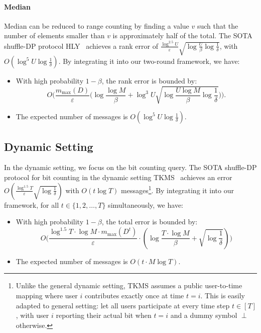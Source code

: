 \paragraph{Median}

Median can be reduced to range counting by finding a value $v$ such that the number of elements smaller than $v$ is approximately half of the total. The SOTA shuffle-DP protocol HLY~\cite{huang2021instance} achieves a rank error of $\frac{\log^{2.5} U}{\varepsilon} \sqrt{\log \frac{U}{\beta}\log \frac{1}{\delta}}$, with $O(\log ^5 U \log \frac{1}{\delta})$.
By integrating it into our two-round framework, we have:
\begin{itemize}
\item With high probability $1-\beta$, the rank error is bounded by: $$O\Big(\frac{m_{\max}(D)}{\varepsilon}\big( \log \frac{\log M}{\beta}+\log^3 U \sqrt{\log \frac{U\log M}{\beta}\log \frac{1}{\delta}}\big)\Big).$$
\item The expected number of messages is $O(\log ^5 U \log \frac{1}{\delta})$.
\end{itemize}


\subsection{Dynamic Setting}
In the dynamic setting, we focus on the bit counting query.
The SOTA shuffle-DP protocol for bit counting in the dynamic setting TKMS~\cite{pmlr-v202-tenenbaum23a} achieves an error 
$O(\frac{\log^{1.5}T}{\varepsilon}\sqrt{\log \frac{1}{\delta}})$
with $O(t\log T)$ messages\footnote{Unlike the general dynamic setting, TKMS assumes a public user-to-time mapping where user $i$ contributes exactly once at time $t=i$. 
This is easily adapted to general setting: let all users participate at every time step $t\in[T]$, with user $i$ reporting their actual bit when $t=i$ and a dummy symbol $\perp$ otherwise.}.
By integrating it into our framework, for all $t\in \{1,2,\dots,T\}$ simultaneously, we have:
\begin{itemize}
    \item With high probability $1-\beta$, the total error is bounded by: 
    \[
    O\Big(
    \frac{\log ^{1.5} T \cdot \log M \cdot m_{\max}(D^t)}{\varepsilon} \cdot (\log \frac{T \cdot \log M}{\beta}+\sqrt{\log\frac{1}{\delta}})
    \Big)
    \]
    \item The expected number of messages is $O( t\cdot M\log T)$.
\end{itemize}

